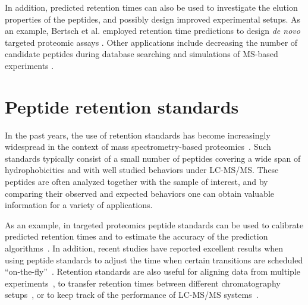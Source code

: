 \documentclass[a4paper]{article}
\begin{document}
\vspace{0.15cm}

In addition, predicted retention times can also be used to investigate
the elution properties of the peptides, and possibly design improved
experimental setups. As an example, Bertsch et al. employed retention
time predictions to design {\em de novo} targeted proteomic
assays \cite{bertsch2010}. Other applications include decreasing the
number of candidate peptides during database
searching \cite{lobas2013} and simulations of MS-based
experiments \cite{bielow2011}.


 
\section{\label{sec:irt}Peptide retention standards}

In the past years, the use of retention standards has become
increasingly widespread in the context of mass spectrometry-based
proteomics~\cite{olegstd, irt}. Such standards typically consist of a
small number of peptides covering a wide span of hydrophobicities and
with well studied behaviors under LC-MS/MS. These peptides are often
analyzed together with the sample of interest, and by comparing their
observed and expected behaviors one can obtain valuable information
for a variety of applications.

\vspace{0.15cm}

As an example, in targeted proteomics peptide standards can be used to
 calibrate predicted retention times and to estimate the accuracy of
 the prediction algorithms~\cite{Kiyonami01022011}. In addition,
 recent studies have reported excellent results when using peptide
 standards to adjust the time when certain transitions are scheduled
 ``on-the-fly''~\cite{seb, irt}. Retention standards are also useful
 for aligning data from multiple experiments~\cite{petritis2003}, to
 transfer retention times between different chromatography
 setups~\cite{seb}, or to keep track of the performance of LC-MS/MS
 systems~\cite{qcal}.



\end{document}
